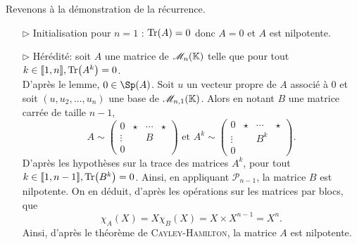 \begin{preuve}
\begin{itemize}
        Revenons à la démonstration de la récurrence.
        \begin{itemize}
            \item[$\rhd$] Initialisation pour $n=1$ : $\Tr(A) = 0$ donc $A = 0$ et $A$ est nilpotente. 
            \item[$\rhd$] Hérédité: soit $A$ une matrice de $\mathscr{M}_n(\mathbb{K})$ telle que pour tout $k \in \llbracket 1, n \rrbracket, \Tr(A^k) = 0$. \\
            D'après le lemme, $0 \in \Sp(A)$. Soit $u$ un vecteur propre de $A$ associé à $0$ et soit $(u, u_2, \dots, u_n)$ une base de $\mathscr{M}_{n,1}(\mathbb{K})$. Alors en notant $B$ une matrice carrée de taille $n-1$, 
            $$A \sim 
            \begin{pmatrix}
            0 & \star & \cdots & \star \\
            \vdots & & B & \\
            0 & & &
            \end{pmatrix}
            \text{ et }
            A^k \sim 
            \begin{pmatrix}
            0 & \star & \cdots & \star \\
            \vdots & & B^k & \\
            0 & & &
            \end{pmatrix}.
            $$
            D'après les hypothèses sur la trace des matrices $A^k$, pour tout $k \in \llbracket 1, n-1 \rrbracket, \Tr(B^k) = 0$. Ainsi, en appliquant $\mathscr{P}_{n-1}$, la matrice $B$ est nilpotente. On en déduit, d'après les opérations sur les matrices par blocs, que
            $$\chi_A(X) = X \chi_{B}(X) = X \times X^{n-1} = X^n.$$
            Ainsi, d'après le théorème de \textsc{Cayley}-\textsc{Hamilton}, la matrice $A$ est nilpotente. 
        \end{itemize}
    \end{itemize}
\end{preuve}

